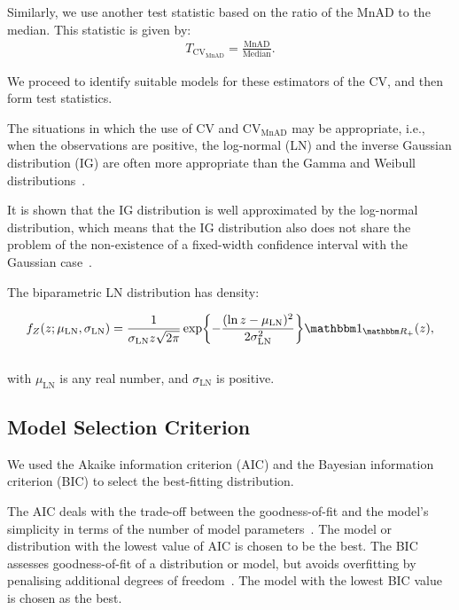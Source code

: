 \documentclass[remotesensing,article,submit,moreauthors,pdftex]{Definitions/mdpi}
\begin{document}
Similarly, we use another test statistic based on the ratio of the MnAD
to the median. This statistic is given by: \begin{align}
    T_{\text{CV}_{\text{MnAD}}}=\frac{\text{MnAD}}{\text{Median}}.
\end{align}

We proceed to identify suitable models for these estimators of the CV,
and then form test statistics.

The situations in which the use of CV and \(\text{CV}_{\text{MnAD}}\)
may be appropriate, i.e., when the observations are positive, the
log-normal (LN) and the inverse Gaussian distribution (IG) are often
more appropriate than the Gamma and Weibull
distributions~\cite{Chaubey2017,takagi1997application}.

It is shown that the IG distribution is well approximated by the
log-normal distribution, which means that the IG distribution also does
not share the problem of the non-existence of a fixed-width confidence
interval with the Gaussian case~\cite{whitmore1978}.

The biparametric LN distribution has density:

\begin{align}
    f_Z(z;\mu_{\text{LN}}, \sigma_{\text{LN}} )=\frac{1}{\sigma_{\text{LN}} z\sqrt{2\pi}}\exp\left\{-\frac{(\ln z- \mu_{\text{LN}})^2}{2\sigma_{\text{LN}}^2}\right\}\mathbbm 1_{\mathbbm R_+}(z),
\end{align}\\
with \(\mu_{\text{LN}}\) is any real number, and \(\sigma_{\text{LN}}\)
is positive.

\subsection{Model Selection Criterion}\label{model-selection-criterion}

We used the Akaike information criterion (AIC) and the Bayesian
information criterion (BIC) to select the best-fitting distribution.

The AIC deals with the trade-off between the goodness-of-fit and the
model's simplicity in terms of the number of model
parameters~\cite{Burnham2004}. The model or distribution with the lowest
value of AIC is chosen to be the best. The BIC assesses goodness-of-fit
of a distribution or model, but avoids overfitting by penalising
additional degrees of freedom~\cite{Dziak2019}. The model with the
lowest BIC value is chosen as the best.
\end{document}
